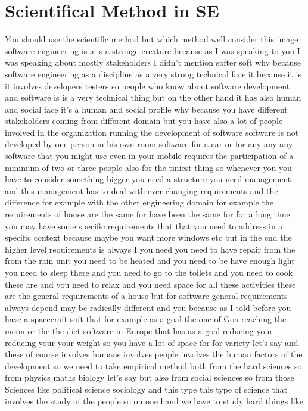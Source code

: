 \documentclass[conference, compsoc, twoside]{IEEEtran}
\begin{document}
 \section{Scientifical Method in SE} %
 \label{sec:scientifical_method_in_se}
 You should use the scientific method but which method well consider this image software engineering is a is a strange creature because as I was speaking to you I was speaking about mostly stakeholders I didn't mention softer soft why because software engineering as a discipline as a very strong technical face it because it is it involves developers testers so people who know about software development and software is is a very technical thing but on the other hand it has also human and social face it's a human and social profile why because you have different stakeholders coming from different domain but you have also a lot of people involved in the organization running the development of software software is not developed by one person in his own room software for a car or for any any any software that you might use even in your mobile requires the participation of a minimum of two or three people also for the tiniest thing so whenever you you have to consider something bigger you need a structure you need management and this management has to deal with ever-changing requirements and the difference 
for example with the other engineering domain 
for example the requirements of house are the same for have been the same for for a long time you may have some specific requirements that that you need to address in a specific context because maybe you want more windows etc but in the end the higher level requirements is always I you need you need to have repair from the from the rain unit you need to be heated and you need to be have enough light you need to sleep there and you need to go to the toilets and you need to cook these are and you need to relax and you need space for all these activities these are the general requirements of a house but for software general requirements always depend may be radically different and you because as I told before you have a spacecraft soft that 
for example as a goal the one of Goa reaching the moon or the the diet software in Europe that has as a goal reducing your reducing your your weight so you have a lot of space for for variety let's say and these of course involves humans involves people involves the human factors of the development so we need to take empirical method both from the hard sciences so from physics maths biology let's say but also from social sciences so from those Sciences like political science sociology and this type this type of science that involves the study of the people so on one hand we have to study hard things like 
\end{document}
